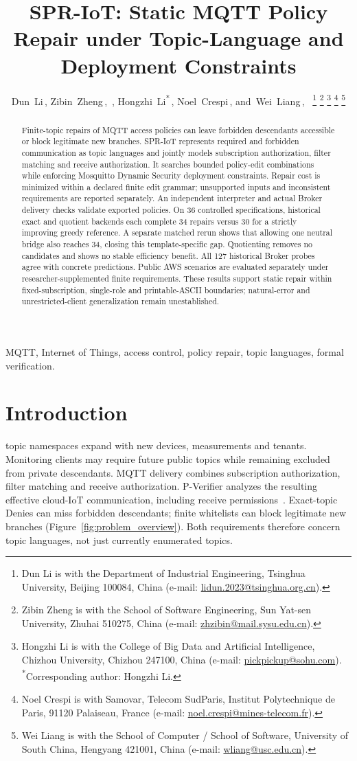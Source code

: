 \documentclass[letterpaper,journal]{IEEEtran}
\title{SPR-IoT: Static MQTT Policy Repair under Topic-Language and Deployment Constraints}
\author{Dun~Li\,\orcidlink{0000-0002-1986-7144},
Zibin~Zheng\,\orcidlink{0000-0001-7872-7718},~\IEEEmembership{Fellow,~IEEE},
Hongzhi~Li\textsuperscript{*}\,\orcidlink{0000-0002-5883-3780},
Noel~Crespi\,\orcidlink{0000-0003-2962-192X},
and~Wei~Liang\,\orcidlink{0000-0002-5074-1363},~\IEEEmembership{Senior~Member,~IEEE}%
\thanks{Dun Li is with the Department of Industrial Engineering, Tsinghua University, Beijing 100084, China (e-mail: \href{mailto:lidun.2023@tsinghua.org.cn}{lidun.2023@tsinghua.org.cn}).}%
\thanks{Zibin Zheng is with the School of Software Engineering, Sun Yat-sen University, Zhuhai 510275, China (e-mail: \href{mailto:zhzibin@mail.sysu.edu.cn}{zhzibin@mail.sysu.edu.cn}).}%
\thanks{Hongzhi Li is with the College of Big Data and Artificial Intelligence, Chizhou University, Chizhou 247100, China (e-mail: \href{mailto:pickpickup@sohu.com}{pickpickup@sohu.com}). \textsuperscript{*}Corresponding author: Hongzhi Li.}%
\thanks{Noel Crespi is with Samovar, Telecom SudParis, Institut Polytechnique de Paris, 91120 Palaiseau, France (e-mail: \href{mailto:noel.crespi@mines-telecom.fr}{noel.crespi@mines-telecom.fr}).}%
\thanks{Wei Liang is with the School of Computer / School of Software, University of South China, Hengyang 421001, China (e-mail: \href{mailto:wliang@usc.edu.cn}{wliang@usc.edu.cn}).}}
\date{}
\begin{document}
\maketitle


\begin{abstract}
Finite-topic repairs of MQTT access policies can leave forbidden descendants accessible or block legitimate new branches. SPR-IoT represents required and forbidden communication as topic languages and jointly models subscription authorization, filter matching and receive authorization. It searches bounded policy-edit combinations while enforcing Mosquitto Dynamic Security deployment constraints. Repair cost is minimized within a declared finite edit grammar; unsupported inputs and inconsistent requirements are reported separately. An independent interpreter and actual Broker delivery checks validate exported policies. On 36 controlled specifications, historical exact and quotient backends each complete 34 repairs versus 30 for a strictly improving greedy reference. A separate matched rerun shows that allowing one neutral bridge also reaches 34, closing this template-specific gap. Quotienting removes no candidates and shows no stable efficiency benefit. All 127 historical Broker probes agree with concrete predictions. Public AWS scenarios are evaluated separately under researcher-supplemented finite requirements. These results support static repair within fixed-subscription, single-role and printable-ASCII boundaries; natural-error and unrestricted-client generalization remain unestablished.
\end{abstract}
\begin{IEEEkeywords}
MQTT, Internet of Things, access control, policy repair, topic languages, formal verification.
\end{IEEEkeywords}

\section{Introduction}
 topic namespaces expand with new devices, measurements and tenants. Monitoring clients may require future public topics while remaining excluded from private descendants. MQTT delivery combines subscription authorization, filter matching and receive authorization. P-Verifier analyzes the resulting effective cloud-IoT communication, including receive permissions~\cite{pverifier}. Exact-topic Denies can miss forbidden descendants; finite whitelists can block legitimate new branches (Figure~\ref{fig:problem_overview}). Both requirements therefore concern topic languages, not just currently enumerated topics. 
\end{document}
